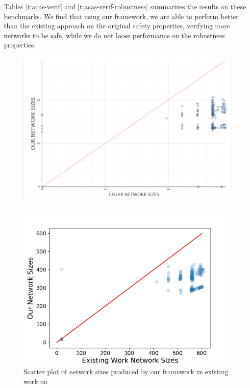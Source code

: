 Tables \ref{t:acas-verif} and \ref{t:acas-verif-robustness} summarizes the
results on these benchmarks. We
find that using our framework, we are able to perform better than the existing
\cegar approach \cite{cegar-nn} on the original safety properties, verifying
more networks to be safe, while we do not loose performance on the robustness
properties. 

\begin{figure}
    \includegraphics[scale=0.2]{figs/scatter-cegar-our-nerualsat-diag.png}
    \caption{ }
    \label{f:scatter-netsizes-old}
\end{figure}

\begin{figure}
    \includegraphics[scale=0.4]{figs/scatter-cegar-our-nerualsat-diag-new.png}
    \caption{Scatter plot of network sizes produced by our framework vs existing
    work \cite{cegar-nn} on \acasxu }
    \label{f:scatter-netsizes}
\end{figure}

